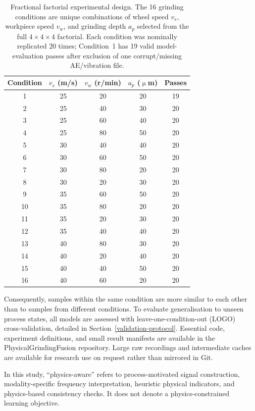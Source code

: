 \begin{table}[htbp]
\centering
\caption{Fractional factorial experimental design. The 16 grinding
conditions are unique combinations of wheel speed $v_s$, workpiece speed
$v_w$, and grinding depth $a_p$ selected from the full
$4 \times 4 \times 4$ factorial. Each condition was nominally replicated
20 times; Condition~1 has 19 valid model-evaluation passes after
exclusion of one corrupt/missing AE/vibration file.}
\label{tbl:condition-design}
\begin{tabular}{@{}ccccc@{}}
\toprule
Condition & $v_s$ (m/s) & $v_w$ (r/min) & $a_p$ (\(\upmu\)m) & Passes \\
\midrule
1  & 25 & 20 & 20 & 19 \\
2  & 25 & 40 & 30 & 20 \\
3  & 25 & 60 & 40 & 20 \\
4  & 25 & 80 & 50 & 20 \\
5  & 30 & 40 & 40 & 20 \\
6  & 30 & 60 & 50 & 20 \\
7  & 30 & 80 & 20 & 20 \\
8  & 30 & 20 & 30 & 20 \\
9  & 35 & 60 & 50 & 20 \\
10 & 35 & 80 & 20 & 20 \\
11 & 35 & 20 & 30 & 20 \\
12 & 35 & 40 & 40 & 20 \\
13 & 40 & 80 & 30 & 20 \\
14 & 40 & 20 & 40 & 20 \\
15 & 40 & 40 & 50 & 20 \\
16 & 40 & 60 & 20 & 20 \\
\bottomrule
\end{tabular}
\end{table}

Consequently, samples within the same condition are more similar to each
other than to samples from different conditions. To evaluate
generalisation to unseen process states, all models are assessed with
leave-one-condition-out (LOGO) cross-validation, detailed in
Section~\ref{validation-protocol}. Essential code, experiment definitions,
and small result manifests are available in the PhysicalGrindingFusion
repository. Large raw recordings and intermediate caches are available for
research use on request rather than mirrored in Git.

In this study, ``physics-aware'' refers to process-motivated signal
construction, modality-specific frequency interpretation, heuristic physical
indicators, and physics-based consistency checks. It does not denote a
physics-constrained learning objective.

